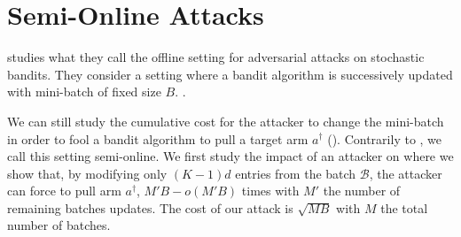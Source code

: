 \section{Semi-Online Attacks}

\cite{liu2019data} studies what they call the offline setting for adversarial attacks on stochastic bandits. They consider a setting where a bandit algorithm is successively updated with mini-batch of fixed size $B$. 
. 

We can still study the cumulative cost for the attacker to change the mini-batch in order to fool a bandit algorithm to pull a target arm $a^{\dagger}$ (). Contrarily to \cite{liu2019data}, we call this setting semi-online. We first study the impact of an attacker on \linucb where we show that, by modifying only $(K-1)d$ entries from the batch $\mathcal{B}$, the attacker can force \linucb to pull arm $a^{\dagger}$, $M'B - o(M'B)$ times with $M'$ the number of remaining batches updates. The cost of our attack is $\sqrt{MB}$ with $M$ the total number of batches.

